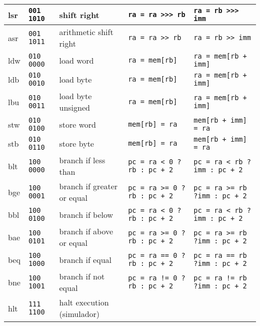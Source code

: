 \documentclass[11pt,a4paper]{report}
\begin{document}
\begin{table}[htb!]
\begin{tabular}{|p{1.5cm}|p{1.5cm}|p{3.5cm}|p{3.0cm}|p{3.0cm}|}
lsr	&\verb|001 1010|	&shift right			&\verb|ra = ra >>> rb|			&\verb|ra = rb >>> imm|		\\ \hline
asr	&\verb|001 1011|	&arithmetic shift right		&\verb|ra = ra >> rb|			&\verb|ra = rb >> imm|		\\ \hline
ldw	&\verb|010 0000|	&load word			&\verb|ra = mem[rb]|			&\verb|ra = mem[rb + imm]|	\\ \hline
ldb	&\verb|010 0010|	&load byte			&\verb|ra = mem[rb]|			&\verb|ra = mem[rb + imm]|	\\ \hline
lbu	&\verb|010 0011|	&load byte unsigned		&\verb|ra = mem[rb]|			&\verb|ra = mem[rb + imm]|	\\ \hline
stw	&\verb|010 0100|	&store word			&\verb|mem[rb] = ra|			&\verb|mem[rb + imm] = ra|	\\ \hline
stb	&\verb|010 0110|	&store byte			&\verb|mem[rb] = ra|			&\verb|mem[rb + imm] = ra|	\\ \hline
blt	&\verb|100 0000|	&branch if less than		&\verb|pc = ra < 0 ?|\newline\verb|rb : pc + 2|		&\verb|pc = ra < rb ?|\newline\verb|imm : pc + 2|	\\ \hline
bge	&\verb|100 0001|	&branch if greater or equal	&\verb|pc = ra >= 0 ?|\newline\verb|rb : pc + 2|	&\verb|pc = ra >= rb ?|\newline\verb|imm : pc + 2|	\\ \hline
bbl	&\verb|100 0100|	&branch if below		&\verb|pc = ra < 0 ?|\newline\verb|rb : pc + 2|		&\verb|pc = ra < rb ?|\newline\verb|imm : pc + 2|	\\ \hline
bae	&\verb|100 0101|	&branch if above or equal	&\verb|pc = ra >= 0 ?|\newline\verb|rb : pc + 2|	&\verb|pc = ra >= rb ?|\newline\verb|imm : pc + 2|	\\ \hline
beq	&\verb|100 1000|	&branch if equal		&\verb|pc = ra == 0 ?|\newline\verb|rb : pc + 2|	&\verb|pc = ra == rb ?|\newline\verb|imm : pc + 2|	\\ \hline
bne	&\verb|100 1001|	&branch if not equal		&\verb|pc = ra != 0 ?|\newline\verb|rb : pc + 2|	&\verb|pc = ra != rb ?|\newline\verb|imm : pc + 2|	\\ \hline
hlt	&\verb|111 1100|	&halt execution (simulador)	& 	&	\\ \hline
\end{tabular}
\end{table}
\end{document}
